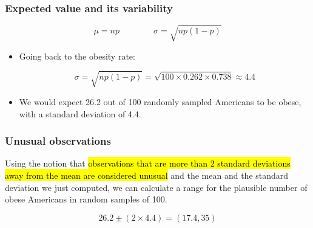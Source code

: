 \documentclass[slidestop,compress,mathserif]{beamer}
\begin{document}
\begin{frame}
\frametitle{Expected value and its variability}

{\[ \mu = np \qquad \qquad \sigma = \sqrt{np(1-p)} \] }

\pause

\begin{itemize}

\item Going back to the obesity rate:

\[ \sigma = \sqrt{np(1-p)} = \sqrt{100 \times 0.262 \times 0.738} \approx  4.4\]

\pause

\item We would expect 26.2 out of 100 randomly sampled Americans to be obese, with a standard deviation of 4.4.

\end{itemize}


\end{frame}


\begin{frame}
\frametitle{Unusual observations}

Using the notion that \hl{observations that are more than 2 standard deviations away from the mean are considered unusual} and the mean and the standard deviation we just computed, we can calculate a range for the plausible number of obese Americans in random samples of 100.

\[ 26.2 \pm (2 \times 4.4) = (17.4, 35) \]

\end{frame}

\end{document}
